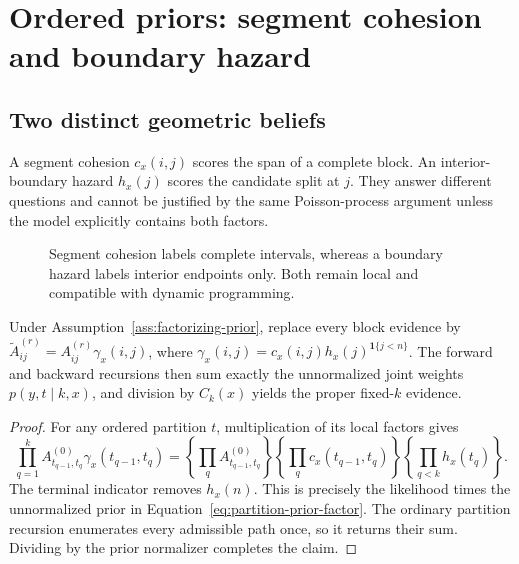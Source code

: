 \chapter[Ordered partition priors]{Ordered priors: segment cohesion\\ and boundary hazard}
\label{ch:priors}

\section{Two distinct geometric beliefs}
\label{sec:irregular}
A segment cohesion $c_x(i,j)$ scores the span of a complete block. An interior-boundary hazard
$h_x(j)$ scores the candidate split at $j$. They answer different questions and cannot be justified
by the same Poisson-process argument unless the model explicitly contains both factors.

\begin{figure}[H]
\centering
\resizebox{0.96\textwidth}{!}{}
\caption{Segment cohesion labels complete intervals, whereas a boundary hazard labels interior endpoints only. Both remain local and compatible with dynamic programming.}
\label{fig:cohesion-hazard}
\end{figure}

\begin{theorem}
\label{thm:prior-local-dp}
Under Assumption~\ref{ass:factorizing-prior}, replace every block evidence by
$\widetilde A^{(r)}_{ij}=A^{(r)}_{ij}\gamma_x(i,j)$, where
$\gamma_x(i,j)=c_x(i,j)h_x(j)^{\mathbf1\{j<n\}}$. The forward and backward recursions then sum
exactly the unnormalized joint weights $p(y,t\mid k,x)$, and division by $C_k(x)$ yields the
proper fixed-$k$ evidence.
\end{theorem}
\begin{proof}
For any ordered partition $t$, multiplication of its local factors gives
\[
 \prod_{q=1}^k A^{(0)}_{t_{q-1},t_q}\gamma_x(t_{q-1},t_q)
 =\left\{\prod_q A^{(0)}_{t_{q-1},t_q}\right\}
  \left\{\prod_q c_x(t_{q-1},t_q)\right\}
  \left\{\prod_{q<k}h_x(t_q)\right\}.
\]
The terminal indicator removes $h_x(n)$. This is precisely the likelihood times the unnormalized
prior in Equation~\eqref{eq:partition-prior-factor}. The ordinary partition recursion enumerates
every admissible path once, so it returns their sum. Dividing by the prior normalizer completes the
claim.
\end{proof}

